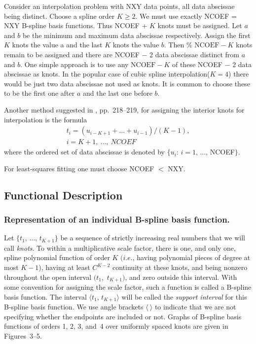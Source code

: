 \documentclass[twoside]{MATH77}
\begin{document}
Consider an interpolation problem with NXY data points, all data abscissae
being distinct. Choose a spline order $K \geq 2$. We must use exactly NCOEF =
NXY B-spline basis functions. Thus NCOEF + $K$ knots must be assigned. Let $a$
and $b$ be the minimum and maximum data abscissae respectively. Assign the
first $K$ knots the value a and the last $K$ knots the value $b$. Then $\text{%
NCOEF} - K$ knots remain to be assigned and there are NCOEF $-$ 2 data
abscissae distinct from $a$ and $b$. One simple approach is to use
any $\text{NCOEF}-K$ of these NCOEF $-$ 2 data abscissae as knots. In the
popular case of cubic spline interpolation($K = 4$) there would be just two
data abscissae not used as knots. It is common to choose these to be the
first one after $a$ and the last one before $b.$

Another method suggested in \cite{deBoor:1978:APG}, pp.~218--219, for
assigning the interior knots for interpolation is the formula
\begin{multline*}
t_i = (u_{i-K+1} + ... + u_{i-1})/(K-1),\\
i = K+1,\ ...,\ NCOEF
\end{multline*}
where the ordered set of data abscissae is denoted by $\{u_i$: $i = 1$, ...,
NCOEF$\}$.

For least-squares fitting one must choose NCOEF $<$ NXY.

\subsection{Functional Description}

\subsubsection{Representation of an individual B-spline basis function.}

Let $\{t_1$, ..., $t_{K+1}\}$ be a sequence of strictly increasing real numbers
that we will call {\em knots}. To within a multiplicative scale factor, there is
one, and only one, spline polynomial function of order $K$ $(i.e.$, having
polynomial pieces of degree at most $K-1$), having at least $C^{K-2}$
continuity at these knots, and being nonzero throughout the open interval $%
(t_1$,\ $t_{K+1})$, and zero outside this interval. With some convention for
assigning the scale factor, such a function is called a B-spline basis
function. The interval $\langle t_1$, $t_{K+1}\rangle $ will be called the
{\em support interval} for this B-spline basis function. We use angle
brackets $\langle \ \rangle $ to indicate that we are not specifying whether
the endpoints are included or not. Graphs of B-spline basis functions of orders
1, 2, 3, and~4 over uniformly spaced knots are given in
Figures~3--5.
\end{document}
